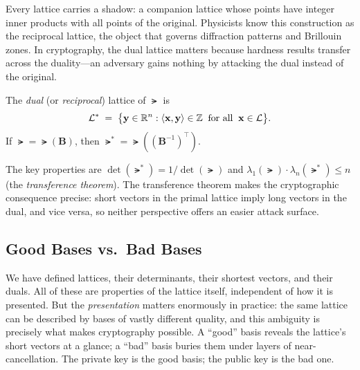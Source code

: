 Every lattice carries a shadow: a companion lattice whose points have integer inner products with all points of the original.  Physicists know this construction as the reciprocal lattice, the object that governs diffraction patterns and Brillouin zones.  In cryptography, the dual lattice matters because hardness results transfer across the duality---an adversary gains nothing by attacking the dual instead of the original.

\begin{definition}
\label{def:dual-lattice}
The \emph{dual} (or \emph{reciprocal}) lattice of $\lat$ is
\begin{equation}
\mathcal{L}^* \;=\; \bigl\{\mathbf{y}\in\mathbb{R}^n : \left\langle \mathbf{x}, \mathbf{y} \right\rangle \in \mathbb{Z} \;\;\text{for all}\;\; \mathbf{x}\in\mathcal{L}\bigr\}.
\end{equation}
If $\lat = \lat(\mathbf{B})$, then $\lat^* = \lat((\mathbf{B}^{-1})^\top)$.
\end{definition}

The key properties are $\det(\lat^*) = 1/\det(\lat)$ and $\lambda_1(\lat)\cdot\lambda_n(\lat^*) \leq n$ (the \emph{transference theorem}).  The transference theorem makes the cryptographic consequence precise: short vectors in the primal lattice imply long vectors in the dual, and vice versa, so neither perspective offers an easier attack surface.


\subsection{Good Bases vs.\ Bad Bases}
\label{subsec:good-bad-basis}

We have defined lattices, their determinants, their shortest vectors, and their duals.  All of these are properties of the lattice itself, independent of how it is presented.  But the \emph{presentation} matters enormously in practice: the same lattice can be described by bases of vastly different quality, and this ambiguity is precisely what makes cryptography possible.  A ``good'' basis reveals the lattice's short vectors at a glance; a ``bad'' basis buries them under layers of near-cancellation.  The private key is the good basis; the public key is the bad one.

